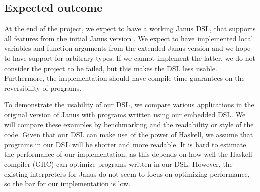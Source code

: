 \documentclass[12pt,a4paper]{article}
\begin{document}
\subsection{Expected outcome}
At the end of the project, we expect to have a working Janus DSL, that supports all features from the initial Janus version \cite{lutz82}. We expect to have implemented local variables and function arguments from the extended Janus version \cite{yokoyama10} and we hope to have support for arbitrary types. If we cannot implement the latter, we do not consider the project to be failed, but this makes the DSL less usable. Furthermore, the implementation should have compile-time guarantees on the reversibility of programs.

To demonstrate the usability of our DSL, we compare various applications in the original version of Janus with programs written using our embedded DSL. We will compare these examples by benchmarking and the readability or style of the code. Given that our DSL can make use of the power of Haskell, we assume that programs in our DSL will be shorter and more readable. It is hard to estimate the performance of our implementation, as this depends on how well the Haskell compiler (GHC) can optimize programs written in our DSL. However, the existing interpreters for Janus do not seem to focus on optimizing performance, so 
the bar for our implementation is low.
\end{document}

